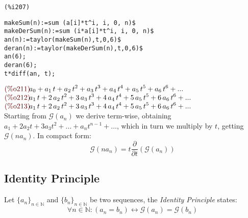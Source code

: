 \noindent
\begin{minipage}[t]{8ex}{\color{red}\bf
\begin{verbatim}
(%i207) 
\end{verbatim}}
\end{minipage}
\begin{minipage}[t]{\textwidth}{\color{blue}
\begin{verbatim}
makeSum(n):=sum (a[i]*t^i, i, 0, n)$
makeDerSum(n):=sum (i*a[i]*t^i, i, 0, n)$
an(n):=taylor(makeSum(n),t,0,6)$
deran(n):=taylor(makeDerSum(n),t,0,6)$
an(6);
deran(6);
t*diff(an, t);
\end{verbatim}}
\end{minipage}
\begin{math}\displaystyle
\parbox{8ex}{\color{labelcolor}(\%o211) }
{a}_{0}+{a}_{1}\,t+{a}_{2}\,{t}^{2}+{a}_{3}\,{t}^{3}+{a}_{4}\,{t}^{4}+{a}_{5}\,{t}^{5}+{a}_{6}\,{t}^{6}+...
\end{math}\\
\begin{math}\displaystyle
\parbox{8ex}{\color{labelcolor}(\%o212) }
{a}_{1}\,t+2\,{a}_{2}\,{t}^{2}+3\,{a}_{3}\,{t}^{3}+4\,{a}_{4}\,{t}^{4}+5\,{a}_{5}\,{t}^{5}+6\,{a}_{6}\,{t}^{6}+...
\end{math}\\
\begin{math}\displaystyle
\parbox{8ex}{\color{labelcolor}(\%o213) }
{a}_{1}\,t+2\,{a}_{2}\,{t}^{2}+3\,{a}_{3}\,{t}^{3}+4\,{a}_{4}\,{t}^{4}+5\,{a}_{5}\,{t}^{5}+6\,{a}_{6}\,{t}^{6}+...
\end{math}\\

Starting from $\mathcal{G} (a_n)$ we derive term-wise, obtaining $ a_1
+ 2a_2 t + 3a_3 t^2 + \ldots + a_n t^{n-1} + \ldots $, which in turn
we multiply by $t$, getting $\mathcal{G} (na_n)$. In compact form:
\begin{displaymath}
  \mathcal{G}(n a_n) = t \frac{\partial}{\partial
    t}\left( \mathcal{G} (a_n) \right)
\end{displaymath}

\subsection{Identity Principle}

Let $\{a_n\}_{n\in\mathbb{N} } $ and $\{b_n\}_{n\in\mathbb{N} } $ be
two sequences, the \emph{Identity Principle} states:
\begin{displaymath}
  \forall n \in \mathbb{N}: \left( a_n = b_n\right) \leftrightarrow
    \mathcal{G} (a_n) = \mathcal{G} (b_n)
\end{displaymath}

